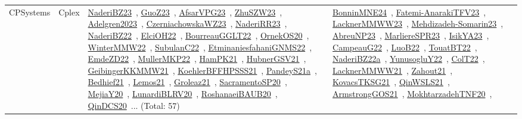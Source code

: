 {\begin{longtable}{lp{3cm}>{\raggedright\arraybackslash}p{6cm}>{\raggedright\arraybackslash}p{6cm}>{\raggedright\arraybackslash}p{8cm}}
CPSystems & Cplex & \href{../works/NaderiBZ23.pdf}{NaderiBZ23}~\cite{NaderiBZ23}, \href{../works/GuoZ23.pdf}{GuoZ23}~\cite{GuoZ23}, \href{../works/AfsarVPG23.pdf}{AfsarVPG23}~\cite{AfsarVPG23}, \href{../works/ZhuSZW23.pdf}{ZhuSZW23}~\cite{ZhuSZW23}, \href{../works/Adelgren2023.pdf}{Adelgren2023}~\cite{Adelgren2023}, \href{../works/CzerniachowskaWZ23.pdf}{CzerniachowskaWZ23}~\cite{CzerniachowskaWZ23}, \href{../works/NaderiRR23.pdf}{NaderiRR23}~\cite{NaderiRR23}, \href{../works/NaderiBZ22.pdf}{NaderiBZ22}~\cite{NaderiBZ22}, \href{../works/ElciOH22.pdf}{ElciOH22}~\cite{ElciOH22}, \href{../works/BourreauGGLT22.pdf}{BourreauGGLT22}~\cite{BourreauGGLT22}, \href{../works/OrnekOS20.pdf}{OrnekOS20}~\cite{OrnekOS20}, \href{../works/WinterMMW22.pdf}{WinterMMW22}~\cite{WinterMMW22}, \href{../works/SubulanC22.pdf}{SubulanC22}~\cite{SubulanC22}, \href{../works/EtminaniesfahaniGNMS22.pdf}{EtminaniesfahaniGNMS22}~\cite{EtminaniesfahaniGNMS22}, \href{../works/EmdeZD22.pdf}{EmdeZD22}~\cite{EmdeZD22}, \href{../works/MullerMKP22.pdf}{MullerMKP22}~\cite{MullerMKP22}, \href{../works/HamPK21.pdf}{HamPK21}~\cite{HamPK21}, \href{../works/HubnerGSV21.pdf}{HubnerGSV21}~\cite{HubnerGSV21}, \href{../works/GeibingerKKMMW21.pdf}{GeibingerKKMMW21}~\cite{GeibingerKKMMW21}, \href{../works/KoehlerBFFHPSSS21.pdf}{KoehlerBFFHPSSS21}~\cite{KoehlerBFFHPSSS21}, \href{../works/PandeyS21a.pdf}{PandeyS21a}~\cite{PandeyS21a}, \href{../works/Bedhief21.pdf}{Bedhief21}~\cite{Bedhief21}, \href{../works/Lemos21.pdf}{Lemos21}~\cite{Lemos21}, \href{../works/Groleaz21.pdf}{Groleaz21}~\cite{Groleaz21}, \href{../works/SacramentoSP20.pdf}{SacramentoSP20}~\cite{SacramentoSP20}, \href{../works/MejiaY20.pdf}{MejiaY20}~\cite{MejiaY20}, \href{../works/LunardiBLRV20.pdf}{LunardiBLRV20}~\cite{LunardiBLRV20}, \href{../works/RoshanaeiBAUB20.pdf}{RoshanaeiBAUB20}~\cite{RoshanaeiBAUB20}, \href{../works/QinDCS20.pdf}{QinDCS20}~\cite{QinDCS20}... (Total: 57) & \href{../works/BonninMNE24.pdf}{BonninMNE24}~\cite{BonninMNE24}, \href{../works/Fatemi-AnarakiTFV23.pdf}{Fatemi-AnarakiTFV23}~\cite{Fatemi-AnarakiTFV23}, \href{../works/LacknerMMWW23.pdf}{LacknerMMWW23}~\cite{LacknerMMWW23}, \href{../works/Mehdizadeh-Somarin23.pdf}{Mehdizadeh-Somarin23}~\cite{Mehdizadeh-Somarin23}, \href{../works/AbreuNP23.pdf}{AbreuNP23}~\cite{AbreuNP23}, \href{../works/MarliereSPR23.pdf}{MarliereSPR23}~\cite{MarliereSPR23}, \href{../works/IsikYA23.pdf}{IsikYA23}~\cite{IsikYA23}, \href{../works/CampeauG22.pdf}{CampeauG22}~\cite{CampeauG22}, \href{../works/LuoB22.pdf}{LuoB22}~\cite{LuoB22}, \href{../works/TouatBT22.pdf}{TouatBT22}~\cite{TouatBT22}, \href{../works/NaderiBZ22a.pdf}{NaderiBZ22a}~\cite{NaderiBZ22a}, \href{../works/YunusogluY22.pdf}{YunusogluY22}~\cite{YunusogluY22}, \href{../works/ColT22.pdf}{ColT22}~\cite{ColT22}, \href{../works/LacknerMMWW21.pdf}{LacknerMMWW21}~\cite{LacknerMMWW21}, \href{../works/Zahout21.pdf}{Zahout21}~\cite{Zahout21}, \href{../works/KovacsTKSG21.pdf}{KovacsTKSG21}~\cite{KovacsTKSG21}, \href{../works/QinWSLS21.pdf}{QinWSLS21}~\cite{QinWSLS21}, \href{../works/ArmstrongGOS21.pdf}{ArmstrongGOS21}~\cite{ArmstrongGOS21}, \href{../works/MokhtarzadehTNF20.pdf}{MokhtarzadehTNF20}~\cite{MokhtarzadehTNF20}, 
\end{longtable}}

